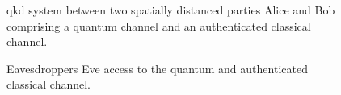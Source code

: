 \begin{figure}[htb]
	\centering
	
	\caption{\Gls{qkd} system between two spatially distanced parties Alice and Bob comprising a quantum channel and an authenticated classical channel.}
\end{figure}

\begin{figure}[htb]
	\centering
	
	\caption{Eavesdroppers Eve access to the quantum and authenticated classical channel.}
\end{figure}

